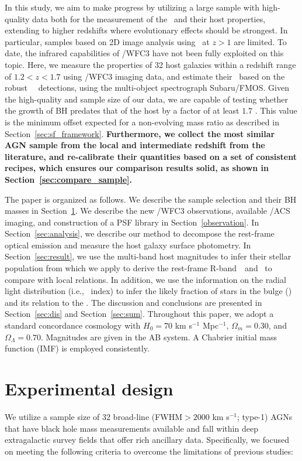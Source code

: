 \documentclass[apj]{emulateapj}
\begin{document}
In this study, we aim to make progress by utilizing a large sample with high-quality data both for the measurement of the \mbh\ and their host properties, extending to higher redshifts where evolutionary effects should be strongest. In particular, samples based on 2D image analysis using \hst\ at $z>1$ are limited. To date, the infrared capabilities of \hst/WFC3 have not been fully exploited on this topic. Here, we measure the properties of 32 host galaxies within a redshift range of $1.2<z<1.7$ using \hst/WFC3 imaging data, and estimate their \mbh\ based on the robust \halpha\ ~detections, using the multi-object spectrograph Subaru/FMOS. Given the high-quality and sample size of our data, we are capable of testing whether the growth of BH predates that of the host by a factor of at least $1.7$ \citep[i.e., $\sim0.23$ dex,][]{Schulze2014}. This value is the minimum offset expected for a non-evolving mass ratio as described in Section~\ref{sec:sf_framework}. {\bf Furthermore, we collect the most similar AGN sample from the local and intermediate redshift from the literature, and re-calibrate their quantities based on a set of consistent recipes, which ensures our comparison results solid, as shown in Section~\ref{sec:compare_sample}.}

The paper is organized as follows. We describe the sample selection and their BH masses in Section~\ref{sec:data}. We describe the new \hst/WFC3 observations, available \hst/ACS imaging, and construction of a PSF library in Section~\ref{observation}. In Section~\ref{sec:analysis}, we describe our method to decompose the rest-frame optical emission and measure the host galaxy surface photometry. In Section~\ref{sec:result}, we use the multi-band host magnitudes to infer their stellar population from which we apply to derive the rest-frame R-band \lhost\,~and \smass\ to compare with local relations. In addition, we use the information on the radial light distribution (i.e., \sersic\ index) to infer the likely fraction of stars in the bulge (\bmass) and its relation to the \mbh. The discussion and conclusions are presented in Section~\ref{sec:dis} and Section~\ref{sec:sum}. Throughout this paper, we adopt a standard concordance cosmology with $H_0= 70$ km s$^{-1}$ Mpc$^{-1}$, $\Omega{_m} = 0.30$, and $\Omega{_\Lambda} = 0.70$. Magnitudes are given in the AB system. A Chabrier initial mass function (IMF) is employed consistently.

\section{Experimental design}
\label{sec:data}
We utilize a sample size of 32 broad-line (FWHM$>2000$ km s$^{-1}$; type-1) AGNs that have black hole mass measurements available and fall within deep extragalactic survey fields that offer rich ancillary data. Specifically, we focused on meeting the following criteria to overcome the limitations of previous studies:
\end{document}
